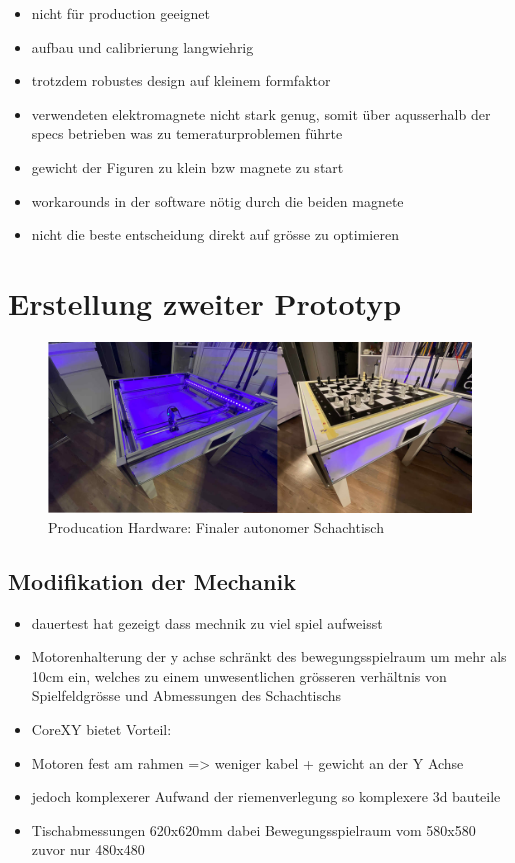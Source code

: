 \begin{itemize}
\tightlist
\item
  nicht für production geeignet
\item
  aufbau und calibrierung langwiehrig
\item
  trotzdem robustes design auf kleinem formfaktor
\item
  verwendeten elektromagnete nicht stark genug, somit über aqusserhalb
  der specs betrieben was zu temeraturproblemen führte
\item
  gewicht der Figuren zu klein bzw magnete zu start
\item
  workarounds in der software nötig durch die beiden magnete
\item
  nicht die beste entscheidung direkt auf grösse zu optimieren
\end{itemize}

\hypertarget{erstellung-zweiter-prototyp}{%
\section{Erstellung zweiter
Prototyp}\label{erstellung-zweiter-prototyp}}

\begin{figure}
\centering
\includegraphics{images/table_images/prod.png}
\caption{Producation Hardware: Finaler autonomer Schachtisch
\label{prod}}
\end{figure}

\hypertarget{modifikation-der-mechanik}{%
\subsection{Modifikation der Mechanik}\label{modifikation-der-mechanik}}

\begin{itemize}
\tightlist
\item
  dauertest hat gezeigt dass mechnik zu viel spiel aufweisst
\item
  Motorenhalterung der y achse schränkt des bewegungsspielraum um mehr
  als 10cm ein, welches zu einem unwesentlichen grösseren verhältnis von
  Spielfeldgrösse und Abmessungen des Schachtischs
\item
  CoreXY bietet Vorteil:
\item
  Motoren fest am rahmen =\textgreater{} weniger kabel + gewicht an der
  Y Achse
\item
  jedoch komplexerer Aufwand der riemenverlegung so komplexere 3d
  bauteile
\item
  Tischabmessungen 620x620mm dabei Bewegungsspielraum vom 580x580 zuvor
  nur 480x480
\end{itemize}

